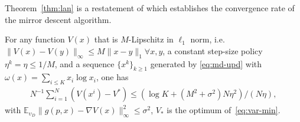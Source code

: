 
Theorem~\ref{thm:lan} is a restatement of \cite[Theorem 4.1.]{lan2020first} which establishes the convergence rate of the mirror descent algorithm. 

\begin{theorem}\label{thm:lan}
    For any function $V(x)$ that is $M$-Lipschitz in $\ell_1$ norm, i.e. $\|V(x) - V(y)\|_\infty \le M \|x-y\|_1 \forall x,y$, a constant step-size policy $\eta^k = \eta \le 1/M$, and 
    a sequence $\{x^k\}_{k\ge 1}$ generated by \eqref{eq:md-upd} with $\omega(x) = \sum_{i\le K} x_i\log x_i$, one has
    \begin{align*}
        N^{-1}\sum_{i=1}^N (V(x^i)  - V^*) \le 
        (\log K + (M^2 + \sigma^2) N \eta^2)/(N\eta),
    \end{align*}
with $\mathbb{E}_{\upsilon_D}\|g(p,x)- \nabla V(x)\|_\infty^2 \le \sigma^2$, $V_*$ is the optimum of~\eqref{eq:var-min}. 
\end{theorem}

